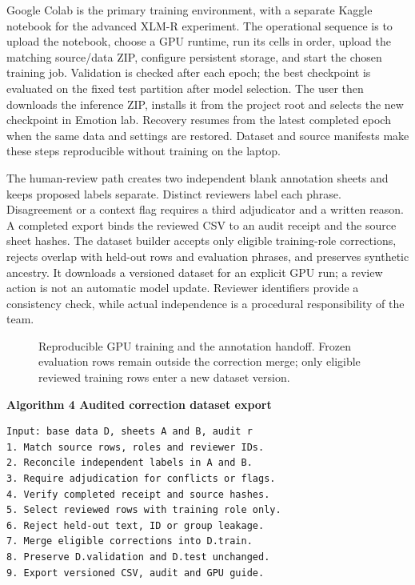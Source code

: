 \documentclass[conference]{IEEEtran}
\begin{document}
Google Colab is the primary training environment, with a separate Kaggle notebook for the advanced XLM-R experiment. The operational sequence is to upload the notebook, choose a GPU runtime, run its cells in order, upload the matching source/data ZIP, configure persistent storage, and start the chosen training job. Validation is checked after each epoch; the best checkpoint is evaluated on the fixed test partition after model selection. The user then downloads the inference ZIP, installs it from the project root and selects the new checkpoint in Emotion lab. Recovery resumes from the latest completed epoch when the same data and settings are restored. Dataset and source manifests make these steps reproducible without training on the laptop.

The human-review path creates two independent blank annotation sheets and keeps proposed labels separate. Distinct reviewers label each phrase. Disagreement or a context flag requires a third adjudicator and a written reason. A completed export binds the reviewed CSV to an audit receipt and the source sheet hashes. The dataset builder accepts only eligible training-role corrections, rejects overlap with held-out rows and evaluation phrases, and preserves synthetic ancestry. It downloads a versioned dataset for an explicit GPU run; a review action is not an automatic model update. Reviewer identifiers provide a consistency check, while actual independence is a procedural responsibility of the team.

\begin{figure}[!t]
\centering
\resizebox{.98\columnwidth}{!}{}
\caption{Reproducible GPU training and the annotation handoff. Frozen evaluation rows remain outside the correction merge; only eligible reviewed training rows enter a new dataset version.}\label{fig:training-review-cycle}
\end{figure}


\noindent\begin{minipage}{\columnwidth}
\textbf{Algorithm 4 Audited correction dataset export}
\begin{lstlisting}
Input: base data D, sheets A and B, audit r
1. Match source rows, roles and reviewer IDs.
2. Reconcile independent labels in A and B.
3. Require adjudication for conflicts or flags.
4. Verify completed receipt and source hashes.
5. Select reviewed rows with training role only.
6. Reject held-out text, ID or group leakage.
7. Merge eligible corrections into D.train.
8. Preserve D.validation and D.test unchanged.
9. Export versioned CSV, audit and GPU guide.
\end{lstlisting}
\end{minipage}
\end{document}
